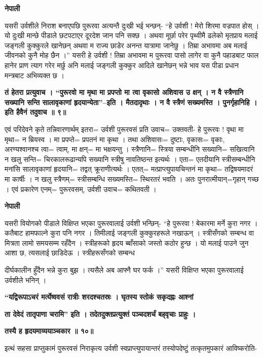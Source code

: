\documentclass[11pt, a5paper]{article}
\begin{document}
\textbf{नेपाली}

यसरी उर्वशीले निराश बनाएपछि पुरूरवा अत्यन्तै दुःखी भई भन्छन्- “हे उर्वशी ! मेरो शिरमा वज्रपात होस् । यो दुःखी मान्छे पीडाले छटपटाएर दूरदेश जान पनि सक्छ । अथवा मूर्छा परेर पृथ्वीमै ढलेको मृतप्राय मलाई जङ्गली कुक्कुरले खानेछन् अथवा म राज्य छाडेर अनन्त यात्रामा जानेछु । तिम्रा अभावमा अब मलाई जीवनको कुनै मोह छैन ।”  यसरी हे उर्वशी ! तिम्रा अभावमा म पुरूरवा पासो लागेर वा कुनै पहाडबाट फाल हानेर प्राण त्याग गरेर मर्छु अनि मलाई जङ्गली कुक्कुर आदिले खानेछन् भन्ने भाव यस पीडा प्रधान मन्त्रबाट अभिव्यक्त छ ।

\textbf{तं हेतरा प्रत्युवाच । “पुरूरवो मा मृथा मा प्रपप्तो मा त्वा वृकासो अशिवास उ क्षन् । न वै स्त्रैणानि सख्यानि सन्ति सालावृकाणां हृदयान्येता”--इति । मैतदादृथाः । न वै स्त्रैणं सख्यमस्ति । पुनर्गृहानिहि । इति हैवैनं तदुवाच ॥ ९॥}

एवं परिदेवने कृते तन्निवारणार्थम् इतरा= उर्वशी पुरूरवसं प्रति उवाच= उक्तवती- हे पुरूरवः ! वृथा मा मृथा= न म्रियस्व । मा प्रपप्ते= प्रपतनं मा कृथा । तथा अशिवासः= दुष्टाः, वृकासः= वृकाः, अरण्यश्वानश्च त्वा= त्वाम्, मा क्षन्= मा भक्षयन्तु । स्त्रैणानि= स्त्रिया सम्बन्धीनि सख्यानि= सखित्वानि न खलु सन्ति= चिरकालरूढान्यपि सख्यानि स्त्रीषु नावतिष्ठन्त इत्यर्थः । एता= एतदीयानि स्त्रीसम्बन्धीनि मनांसि सालावृकाणां हृदयानि= तद्वत् क्रूराणीत्यर्थः । एतत्= मत्प्राप्त्युपायचिन्तनं मा कृथा= तद्विषयमादरं मा कार्षीः । न खलु स्त्रैणम्= स्त्रीसम्बन्धि सख्यमस्ति= स्थिरतरं भवति । अतः पुनरात्मीयान्=गृहान् गच्छ । एवं प्रकारेण एनम्= पुरूरवसम्, उर्वशी उवाच= कथितवती ।

\textbf{नेपाली}

यसरी वियोगको पीडाले विक्षिप्त भएका पुरूरवालाई उर्वशी भन्छिन्- “हे पुरूरवा ! बेकारमा मर्ने कुरा नगर । कतैबाट हामफाल्ने कुरा पनि नगर । तिमीलाई जङ्गली कुक्कुरहरूले नखाऊन् । स्त्रीसँगको सम्बन्ध वा मित्रता लामो समयसम्म रहँदैन । स्त्रीहरूको हृदय ब्बाँसाको जस्तो कठोर हुन्छ । यो मलाई पाउने जुन आशा छ, त्यसलाई छाडिदेऊ । स्त्रीहरूसँगको सम्बन्ध

दीर्घकालीन हुँदैन भन्ने कुरा बुझ । त्यसैले अब आफ्नै घर फर्क ।” यसरी विक्षिप्त भएका पुरूरवालाई उर्वशीले भनिन् ।

\textbf{“यद्विरूपाऽचरं मर्त्येष्ववसं रात्रीः शरदश्चतस्रः । घृतस्य स्तोकं सकृदह्नः आश्नां}

\textbf{ता देवेदं तातृपाणा चरामि”  इति । तदेतदुक्तप्रत्युक्तं पञ्चदशर्चं बह्‌वृचाः प्राहुः ।}

\textbf{तस्यै ह हृदयमाव्ययाञ्चकार ॥ १०॥}

इत्थं सहसा प्राप्तुकामं पुरूरवसं निराकृत्य उर्वशी स्वप्राप्त्युपायान्तरं तस्योपदेष्टुं तत्कृतमुपकारं आविष्करोति-
\end{document}
